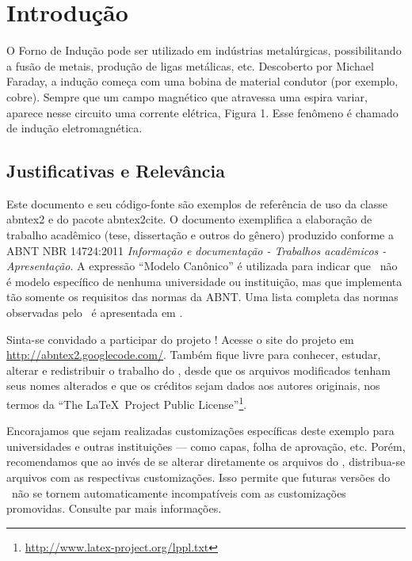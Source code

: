 
\chapter[Introdução]{Introdução}
O Forno de Indução pode ser utilizado em indústrias metalúrgicas, possibilitando a fusão de metais, produção de ligas metálicas, etc. Descoberto por Michael Faraday, a indução começa com uma bobina de material condutor (por exemplo, cobre). Sempre que um campo magnético que atravessa uma espira variar, aparece nesse circuito uma corrente elétrica, Figura 1. Esse fenômeno é chamado de indução eletromagnética.
\section{Justificativas e Relev{\^a}ncia}
%
Este documento e seu código-fonte são exemplos de referência de uso da classe
\textsf{abntex2} e do pacote \textsf{abntex2cite}. O documento 
exemplifica a elaboração de trabalho acadêmico (tese, dissertação e outros do
gênero) produzido conforme a ABNT NBR 14724:2011 \emph{Informação e documentação
- Trabalhos acadêmicos - Apresentação}.
A expressão ``Modelo Canônico'' é utilizada para indicar que \abnTeX\ não é
modelo específico de nenhuma universidade ou instituição, mas que implementa tão
somente os requisitos das normas da ABNT. Uma lista completa das normas
observadas pelo \abnTeX\ é apresentada em .

Sinta-se convidado a participar do projeto \abnTeX! Acesse o site do projeto em
\url{http://abntex2.googlecode.com/}. Também fique livre para conhecer,
estudar, alterar e redistribuir o trabalho do \abnTeX, desde que os arquivos
modificados tenham seus nomes alterados e que os créditos sejam dados aos
autores originais, nos termos da ``The \LaTeX\ Project Public
License''\footnote{\url{http://www.latex-project.org/lppl.txt}}.

Encorajamos que sejam realizadas customizações específicas deste exemplo para
universidades e outras instituições --- como capas, folha de aprovação, etc.
Porém, recomendamos que ao invés de se alterar diretamente os arquivos do
\abnTeX, distribua-se arquivos com as respectivas customizações.
Isso permite que futuras versões do \abnTeX~não se tornem automaticamente
incompatíveis com as customizações promovidas. Consulte
 par mais informações.

